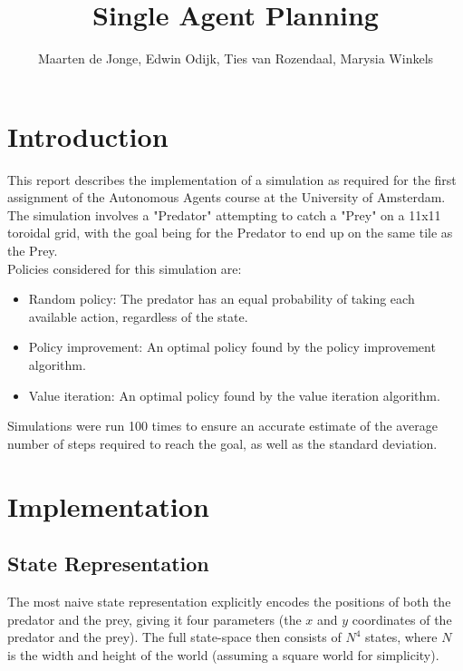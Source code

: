 \documentclass[a4paper, 12pt]{article}
\begin{document}
\title{Single Agent Planning}
\author{Maarten de Jonge, Edwin Odijk, Ties van Rozendaal, Marysia Winkels}
\maketitle

\section*{Introduction}
This report describes the implementation of a simulation as required for the first assignment of the Autonomous Agents course at the University of Amsterdam. The simulation involves a "Predator" attempting to catch a "Prey" on a 11x11 toroidal grid, with the goal being for the Predator to end up on the same tile as the Prey.\\

Policies considered for this simulation are:
\begin{itemize}
	\item Random policy: The predator has an equal probability of taking each
		available action, regardless of the state.
	\item Policy improvement: An optimal policy found by the policy improvement
		algorithm.
	\item Value iteration: An optimal policy found by the value iteration
		algorithm.
\end{itemize}

Simulations were run 100 times to ensure an accurate estimate of the average number of steps required to reach the goal, as well as the standard deviation.

\section*{Implementation} 

\subsection*{State Representation}
The most naive state representation explicitly encodes the positions of both the
predator and the prey, giving it four parameters (the $x$ and $y$ coordinates of
the predator and the prey). The full state-space then consists of $N^4$ states,
where $N$ is the width and height of the world (assuming a square world for
simplicity).
\end{document}
